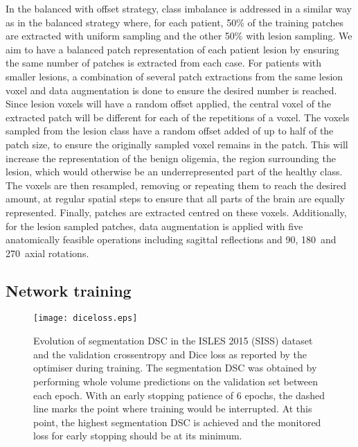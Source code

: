 \documentclass[letterpaper,final,authoryear,3p,times,twocolumn]{elsarticle}
\begin{document}
In the balanced with offset strategy, class imbalance is addressed in a similar way as in the balanced strategy where, for each patient, 50\% of the training patches are extracted with uniform sampling and the other 50\% with lesion sampling. We aim to have a balanced patch representation of each patient lesion by ensuring the same number of patches is extracted from each case. For patients with smaller lesions, a combination of several patch extractions from the same lesion voxel and data augmentation is done to ensure the desired number is reached. Since lesion voxels will have a random offset applied, the central voxel of the extracted patch will be different for each of the repetitions of a voxel. The voxels sampled from the lesion class have a random offset added of up to half of the patch size, to ensure the originally sampled voxel remains in the patch. This will increase the representation of the benign oligemia, the region surrounding the lesion, which would otherwise be an underrepresented part of the healthy class. The voxels are then resampled, removing or repeating them to reach the desired amount, at regular spatial steps to ensure that all parts of the brain are equally represented. Finally, patches are extracted centred on these voxels. Additionally, for the lesion sampled patches, data augmentation is applied with five anatomically feasible operations including sagittal reflections and 90\textdegree, 180\textdegree~and 270\textdegree~axial rotations.

\subsection{Network training}

\begin{figure}[t]
	\centering
	\texttt{[image: diceloss.eps]} %
	\caption{Evolution of segmentation DSC in the ISLES 2015 (SISS) dataset and the validation crossentropy and Dice loss as reported by the optimiser during training. The segmentation DSC was obtained by performing whole volume predictions on the validation set between each epoch. With an early stopping patience of 6 epochs, the dashed line marks the point where training would be interrupted. At this point, the highest segmentation DSC is achieved and the monitored loss for early stopping should be at its minimum.}
	\label{fig:diceloss}
\end{figure}
\end{document}
